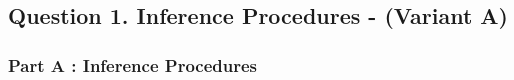 \documentclass[a4paper,12pt]{article}
\begin{document}
\subsection*{Question 1. Inference Procedures - (Variant A) }
\subsubsection*{Part A : Inference Procedures}
\end{document}
